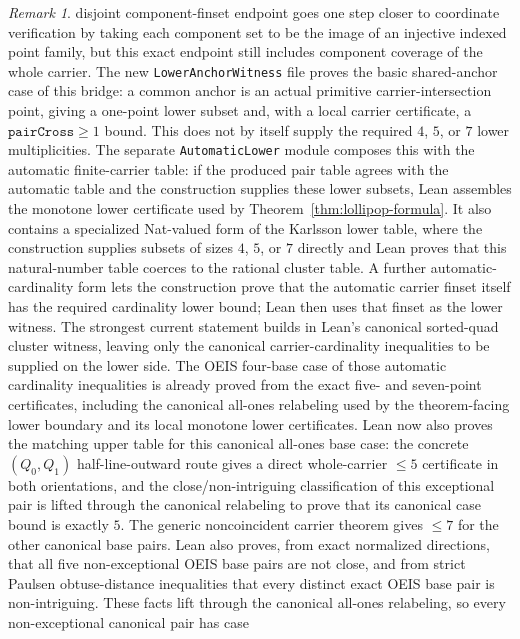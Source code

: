 \documentclass[12pt]{article}
\theoremstyle{plain}
\theoremstyle{definition}
\theoremstyle{remark}
\newtheorem{remark}[theorem]{Remark}
\begin{document}
\begin{remark}
disjoint component-finset endpoint goes one step closer to coordinate
verification by taking each component set to be the image of an injective
indexed point family, but this exact endpoint still includes component
coverage of the whole carrier.  The new
\texttt{LowerAnchorWitness} file proves the
basic shared-anchor case of this bridge: a common anchor is an actual
primitive carrier-intersection point, giving a one-point lower subset and,
with a local carrier certificate, a \(\texttt{pairCross}\ge1\) bound.  This
does not by itself supply the required \(4\), \(5\), or \(7\) lower
multiplicities.  The separate
\texttt{AutomaticLower} module composes this with
the automatic finite-carrier table: if the produced pair table agrees with
the automatic table and the construction supplies these lower subsets, Lean
assembles the monotone lower certificate used by
Theorem~\ref{thm:lollipop-formula}.  It also contains a specialized
Nat-valued form of the Karlsson lower table, where the construction supplies
subsets of sizes \(4\), \(5\), or \(7\) directly and Lean proves that this
natural-number table coerces to the rational cluster table.  A further
automatic-cardinality form lets the construction prove that the automatic
carrier finset itself has the required cardinality lower bound; Lean then uses
that finset as the lower witness.  The strongest current statement builds in
Lean's canonical sorted-quad cluster witness, leaving only the canonical
carrier-cardinality inequalities to be supplied on the lower side.  The OEIS
four-base case of those automatic cardinality inequalities is already proved
from the exact five- and seven-point certificates, including the canonical
all-ones relabeling used by the theorem-facing lower boundary and its local
monotone lower certificates.  Lean now also proves the matching upper table
for this canonical all-ones base case: the concrete \((Q_0,Q_1)\)
half-line-outward route gives a direct whole-carrier \(\le 5\) certificate in
both orientations, and the close/non-intriguing classification of this
exceptional pair is lifted through the canonical relabeling to prove that its
canonical case bound is exactly \(5\).  The generic noncoincident carrier
theorem gives \(\le 7\) for the other canonical base pairs.  Lean also proves,
from exact normalized directions, that all five non-exceptional OEIS base pairs
are not close, and from strict Paulsen obtuse-distance inequalities that every
distinct exact OEIS base pair is non-intriguing.  These facts lift through the
canonical all-ones relabeling, so every non-exceptional canonical pair has case

\end{remark}
\end{document}
